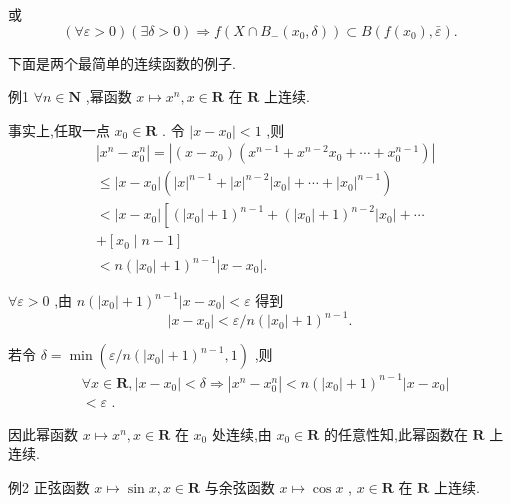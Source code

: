 或
$$\left( {\forall \varepsilon  > 0}\right) \left( {\exists \delta  > 0}\right)  \Rightarrow  f\left( {X \cap  {B}_{ - }\left( {{x}_{0},\delta }\right) }\right)  \subset  B\left( {f\left( {x}_{0}\right) ,\bar{\varepsilon }}\right) .$$

下面是两个最简单的连续函数的例子.

例1 $\forall n \in  \mathbf{N}$ ,幂函数 $x \mapsto  {x}^{n},x \in  \mathbf{R}$ 在 $\mathbf{R}$ 上连续.

事实上,任取一点 ${x}_{0} \in  \mathbf{R}$ . 令 $\left| {x - {x}_{0}}\right|  < 1$ ,则
\begin{align*}
	&\left| {{x}^{n} - {x}_{0}^{n}}\right|  = \left| {\left( {x - {x}_{0}}\right) \left( {{x}^{n - 1} + {x}^{n - 2}{x}_{0} + \cdots  + {x}_{0}^{n - 1}}\right) }\right|\\
	&\leq  \left| {x - {x}_{0}}\right| \left( {{\left| x\right| }^{n - 1} + {\left| x\right| }^{n - 2}\left| {x}_{0}\right|  + \cdots  + {\left| {x}_{0}\right| }^{n - 1}}\right)\\
	&< \left| {x - {x}_{0}}\right| \left\lbrack  {{\left( \left| {x}_{0}\right|  + 1\right) }^{n - 1} + {\left( \left| {x}_{0}\right|  + 1\right) }^{n - 2}\left| {x}_{0}\right|  + \cdots }\right.\\
	&+ \left\lbrack  {{x}_{0} \mid  n - 1}\right\rbrack\\
	&< n{\left( \left| {x}_{0}\right|  + 1\right) }^{n - 1}\left| {x - {x}_{0}}\right| .
\end{align*}

$\forall \varepsilon  > 0$ ,由 $n{\left( \left| {x}_{0}\right|  + 1\right) }^{n - 1}\left| {x - {x}_{0}}\right|  < \varepsilon$ 得到
$$\left| {x - {x}_{0}}\right|  < \varepsilon /n{\left( \left| {x}_{0}\right|  + 1\right) }^{n - 1}.$$

若令 $\delta  = \min \left( {\varepsilon /n{\left( \left| {x}_{0}\right|  + 1\right) }^{n - 1},1}\right)$ ,则
\begin{align*}
	&\forall x \in  \mathbf{R},\left| {x - {x}_{0}}\right|  < \delta  \Rightarrow  \left| {{x}^{n} - {x}_{0}^{n}}\right|  < n{\left( \left| {x}_{0}\right|  + 1\right) }^{n - 1}\left| {x - {x}_{0}}\right|\\
	&< \varepsilon \text{ . }
\end{align*}

因此幂函数 $x \mapsto  {x}^{n},x \in  \mathbf{R}$ 在 ${x}_{0}$ 处连续,由 ${x}_{0} \in  \mathbf{R}$ 的任意性知,此幂函数在 $\mathbf{R}$ 上连续.

例2 正弦函数 $x \mapsto  \sin x,x \in  \mathbf{R}$ 与余弦函数 $x \mapsto  \cos x$ , $x \in  \mathbf{R}$ 在 $\mathbf{R}$ 上连续.

